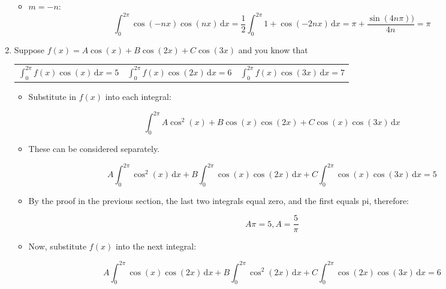 \documentclass[11pt]{article}
\begin{document}
\begin{enumerate}
\begin{itemize}
\item $m = -n$:
\begin{equation*}
\int_0^{2\pi} \! \cos(-nx)\cos(nx) \, \mathrm{d} x = \frac{1}{2}\int_0^{2\pi} \! 1 + \cos(-2nx) \, \mathrm{d} x = \pi + \frac{\sin(4n\pi))}{4n} = \pi
\end{equation*}

\end{itemize}

\item Suppose $f(x) = A\cos(x) + B\cos(2x) + C\cos(3x)$ and you know that
\begin{table}[h]
\begin{center}
	\begin{tabularx}{1\textwidth}{X X X}
	$ \int_0^{2\pi} \! f(x)\cos(x) \, \mathrm{d} x = 5 $ & 
	$ \int_0^{2\pi} \! f(x)\cos(2x) \, \mathrm{d} x = 6$ &
	$\int_0^{2\pi} \! f(x)\cos(3x) \, \mathrm{d} x = 7$ \\
	\end{tabularx}
\end{center}
\end{table}

\begin{itemize}

\item Substitute in $f(x)$ into each integral:

\begin{equation*}
\int_0^{2\pi} \! A\cos^2(x) + B\cos(x)\cos(2x) + C\cos(x)\cos(3x) \, \mathrm{d} x
\end{equation*}

\item These can be considered separately. 

\begin{equation*}
A \int_0^{2\pi} \! \cos^2(x) \, \mathrm{d} x + 
B \int_0^{2\pi} \! \cos(x)\cos(2x) \, \mathrm{d} x + 
C \int_0^{2\pi} \! \cos(x)\cos(3x) \, \mathrm{d} x = 5
\end{equation*}

\item By the proof in the previous section, the last two integrals equal zero, and the first equals pi, therefore:

\begin{equation*}
A\pi = 5, A = \frac{5}{\pi}
\end{equation*}

\item Now, substitute $f(x)$ into the next integral:

\begin{equation*}
A \int_0^{2\pi} \! \cos(x)\cos(2x) \, \mathrm{d} x + 
B \int_0^{2\pi} \! \cos^2(2x) \, \mathrm{d} x + 
C \int_0^{2\pi} \! \cos(2x)\cos(3x) \, \mathrm{d} x = 6
\end{equation*}


\end{itemize}
\end{enumerate}
\end{document}
